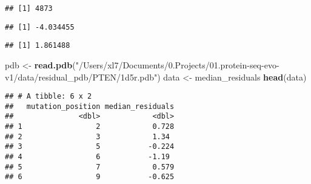 \documentclass[
]{article}
\newenvironment{Shaded}{\begin{snugshade}}{\end{snugshade}}
\newcommand{\AttributeTok}[1]{\textcolor[rgb]{0.13,0.29,0.53}{#1}}
\newcommand{\CommentTok}[1]{\textcolor[rgb]{0.56,0.35,0.01}{\textit{#1}}}
\newcommand{\ConstantTok}[1]{\textcolor[rgb]{0.56,0.35,0.01}{#1}}
\newcommand{\FunctionTok}[1]{\textcolor[rgb]{0.13,0.29,0.53}{\textbf{#1}}}
\newcommand{\NormalTok}[1]{#1}
\newcommand{\OtherTok}[1]{\textcolor[rgb]{0.56,0.35,0.01}{#1}}
\newcommand{\SpecialCharTok}[1]{\textcolor[rgb]{0.81,0.36,0.00}{\textbf{#1}}}
\newcommand{\StringTok}[1]{\textcolor[rgb]{0.31,0.60,0.02}{#1}}
\begin{document}
\begin{verbatim}
## [1] 4873
\end{verbatim}

\begin{Shaded}
\end{Shaded}

\begin{verbatim}
## [1] -4.034455
\end{verbatim}

\begin{Shaded}
\end{Shaded}

\begin{verbatim}
## [1] 1.861488
\end{verbatim}

\begin{Shaded}
\begin{Highlighting}[]
\NormalTok{pdb }\OtherTok{\textless{}{-}} \FunctionTok{read.pdb}\NormalTok{(}\StringTok{"/Users/xl7/Documents/0.Projects/01.protein{-}seq{-}evo{-}v1/data/residual\_pdb/PTEN/1d5r.pdb"}\NormalTok{)}
\NormalTok{data }\OtherTok{\textless{}{-}}\NormalTok{ median\_residuals}
\FunctionTok{head}\NormalTok{(data)}
\end{Highlighting}
\end{Shaded}

\begin{verbatim}
## # A tibble: 6 x 2
##   mutation_position median_residuals
##               <dbl>            <dbl>
## 1                 2            0.728
## 2                 3            1.34 
## 3                 5           -0.224
## 4                 6           -1.19 
## 5                 7            0.579
## 6                 9           -0.625
\end{verbatim}
\end{document}
